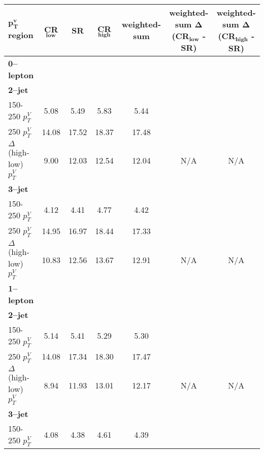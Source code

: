 \begin{table}[!htb]
  \centering
  \begin{tabular}{lS[table-format=3.2]S[table-format=3.2]S[table-format=3.2]S[table-format=3.2]S[table-format=3.2]S[table-format=3.2]}
    \toprule
    {\bfseries $\bm{p_T^v}$ region} & {\bfseries CR$\bm{_{\text{low}}}$} & {\bfseries SR} & {\bfseries CR$\bm{_{high}}$} & {\bfseries weighted-sum} & {\bfseries weighted-sum $\bm{\Delta}$(CR$\bm{_{\text{low}}}$ - SR)}  & {\bfseries weighted-sum $\bm{\Delta}$(CR$\bm{_{high}}$ - SR)} \\
    \midrule
    {\bfseries 0--lepton}& & & & & & \\
    {\bfseries 2--jet} & & & & & & \\
    150-250 $p_T^V$ & 5.08       & 5.49    & 5.83         & 5.44    &   {} & {} \\
    250 $p_T^V$                  & 14.08      & 17.52  & 18.37        & 17.48    &         &           \\
    $\Delta$(high-low) $p_T^V$   & 9.00       & 12.03  & 12.54        & 12.04    &    N/A      &     N/A \\
    {\bfseries 3--jet} & & & & & & \\
    150-250 $p_T^V$              & 4.12       & 4.41    & 4.77         & 4.42     &   {} & {} \\
    250 $p_T^V$                  & 14.95      & 16.97   & 18.44        & 17.33    &          &            \\
    $\Delta$(high-low) $p_T^V$   & 10.83      & 12.56   & 13.67        & 12.91    &    N/A      &  N/A     \\
    {\bfseries 1--lepton} & & & & & & \\
    {\bfseries 2--jet} & & & & & &  \\
    150-250 $p_T^V$              & 5.14  & 5.41  & 5.29  & 5.30  &   {} &  {} \\
    250 $p_T^V$                  & 14.08 & 17.34 & 18.30 & 17.47 &               &         \\
    $\Delta$(high-low) $p_T^V$   & 8.94  & 11.93 & 13.01 & 12.17 &      N/A         &   N/A  \\
    {\bfseries 3--jet} & & & & & & \\
    150-250 $p_T^V$              & 4.08  & 4.38  & 4.61  & 4.39  &    {}     & {} \\ 

\end{tabular}
\end{table}
